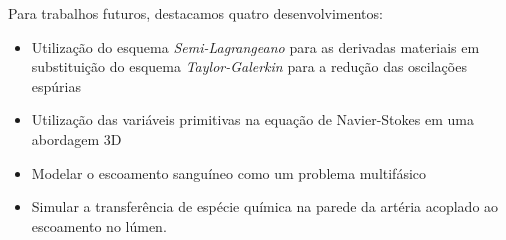 \vspace{0.7cm}
\noindent
Para trabalhos futuros, destacamos quatro desenvolvimentos:

\begin{itemize}
 \vspace{-0.3cm}
 \item Utilização do esquema \textit{Semi-Lagrangeano} para as derivadas materiais
       em substituição do esquema \textit{Taylor-Galerkin}
       para a redução das oscilações espúrias  

 \item Utilização das variáveis primitivas na equação de Navier-Stokes em uma abordagem 3D
 
 \item Modelar o escoamento sanguíneo como um problema multifásico

 \item Simular a transferência de espécie química na parede da artéria acoplado ao escoamento no lúmen.
\end{itemize}








